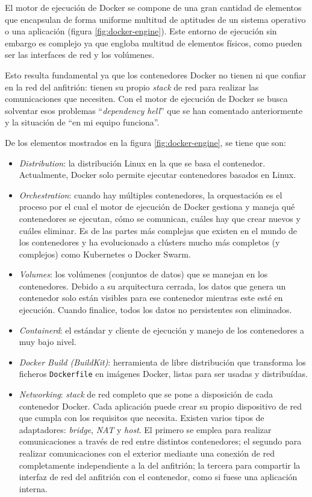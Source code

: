 El motor de ejecución de Docker se compone de una gran cantidad de elementos que
encapsulan de forma uniforme multitud de aptitudes de un sistema operativo o una
aplicación (figura \ref{fig:docker-engine}). Este entorno de ejecución sin embargo
es complejo ya que engloba multitud de elementos físicos, como pueden ser las interfaces
de red y los volúmenes.

Esto resulta fundamental ya que los contenedores Docker no tienen ni que confiar en
la red del anfitrión: tienen su propio \textit{stack} de red para realizar las comunicaciones
que necesiten. Con el motor de ejecución de Docker se busca solventar esos problemas
``\textit{dependency hell}'' que se han comentado anteriormente y la situación de ``en mi equipo
funciona''.

De los elementos mostrados en la figura \ref{fig:docker-engine}, se tiene que son:

\begin{itemize}
    \item \textit{Distribution}: la distribución Linux en la que se basa el contenedor.
          Actualmente, Docker solo permite ejecutar contenedores basados en Linux.
    \item \textit{Orchestration}: cuando hay múltiples contenedores, la orquestación
          es el proceso por el cual el motor de ejecución de Docker gestiona y
          maneja qué contenedores se ejecutan, cómo se comunican, cuáles hay que
          crear nuevos y cuáles eliminar. Es de las partes más complejas que existen
          en el mundo de los contenedores y ha evolucionado a clústers mucho más
          completos (y complejos) como Kubernetes o Docker Swarm.
    \item \textit{Volumes}: los volúmenes (conjuntos de datos) que se manejan en los
          contenedores. Debido a su arquitectura cerrada, los datos que genera un
          contenedor solo están visibles para ese contenedor mientras este esté en
          ejecución. Cuando finalice, todos los datos no persistentes son eliminados.
    \item \textit{Containerd}: el estándar y cliente de ejecución y manejo de los
          contenedores a muy bajo nivel.
    \item \textit{Docker Build (BuildKit)}: herramienta de libre distribución que
          transforma los ficheros \texttt{Dockerfile} en imágenes Docker, listas
          para ser usadas y distribuídas.
    \item \textit{Networking}: \textit{stack} de red completo que se pone a disposición
          de cada contenedor Docker. Cada aplicación puede crear su propio dispositivo
          de red que cumpla con los requisitos que necesita. Existen varios tipos de
          adaptadores: \textit{bridge}, \textit{NAT} y \textit{host}. El primero
          se emplea para realizar comunicaciones a través de red entre distintos
          contenedores; el segundo para realizar comunicaciones con el exterior
          mediante una conexión de red completamente independiente a la del anfitrión;
          la tercera para compartir la interfaz de red del anfitrión con el contenedor,
          como si fuese una aplicación interna.
\end{itemize}

